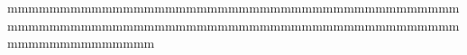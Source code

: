 \documentclass[preview]{standalone}
\begin{document}
\begin{center}
mmmmmmmmmmmmmmmmmmmmmmmmmmmmmmmmmmmmmmmmmmmmmmmmmmmmmmmmmmmmmmmmmmmmmmmmmmmmmmmmmmmmmmmmmmmmmmmmmmmm
\end{center}
\end{document}
